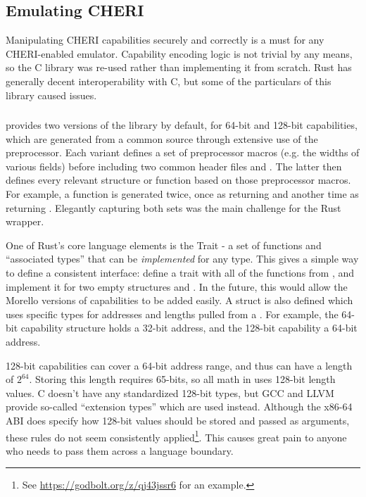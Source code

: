 \subsection{Emulating CHERI}

Manipulating CHERI capabilities securely and correctly is a must for any CHERI-enabled emulator.
Capability encoding logic is not trivial by any means, so the  C library was re-used rather than implementing it from scratch.
Rust has generally decent interoperability with C, but some of the particulars of this library caused issues.

\subsubsection{}
 provides two versions of the library by default, for 64-bit and 128-bit capabilities, which are generated from a common source through extensive use of the preprocessor.
Each variant defines a set of preprocessor macros (e.g. the widths of various fields) before including two common header files  and .
The latter then defines every relevant structure or function based on those preprocessor macros.
For example, a function  is generated twice, once as   returning  and another time as  returning .
Elegantly capturing both sets was the main challenge for the Rust wrapper.


One of Rust's core language elements is the Trait - a set of functions and \enquote{associated types} that can be \emph{implemented} for any type.
This gives a simple way to define a consistent interface: define a trait  with all of the functions from , and implement it for two empty structures  and .
In the future, this would allow the Morello versions of capabilities to be added easily.
A struct  is also defined which uses specific types for addresses and lengths pulled from a .
For example, the 64-bit capability structure holds a 32-bit address, and the 128-bit capability a 64-bit address.

128-bit capabilities can cover a 64-bit address range, and thus can have a length of $2^{64}$.
Storing this length requires 65-bits, so all math in  uses 128-bit length values.
C doesn't have any standardized 128-bit types, but GCC and LLVM provide so-called ``extension types'' which are used instead.
Although the x86-64 ABI does specify how 128-bit values should be stored and passed as arguments\cite{specification-x86-psABI-v1.0}, these rules do not seem consistently applied\footnote{See \url{https://godbolt.org/z/qj43jssr6} for an example.}.
This causes great pain to anyone who needs to pass them across a language boundary.

